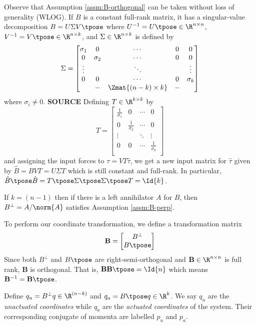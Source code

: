 Observe that Assumption \ref{assm:B-orthogonal} can be taken without loss of
generality (WLOG). If \(B\) is a constant full-rank matrix, 
it has a singular-value decomposition 
\(B = U \Sigma V\tpose\) where \(U^{-1} = U\tpose \in \R^{n \times n}\), 
\(V^{-1} = V\tpose \in \R^{n \times k}\), and \(\Sigma \in \R^{n \times k}\) is
defined by
\[
    \Sigma = \begin{bmatrix}
        \sigma_1 & 0 & \cdots & 0 & 0 \\
        0 & \sigma_2 & \cdots & 0 & 0 \\
        \vdots & & \ddots &  & \vdots \\
        0 & 0 & \cdots & 0 & \sigma_k \\
          & - & \Zmat{(n-k)\times k} & -  &\\
    \end{bmatrix}
\]
where \(\sigma_i \neq 0\).
\textbf{SOURCE}
Defining \(T \in \R^{k \times k}\) by
\[
    T = \begin{bmatrix}
        \frac{1}{\sigma_1} & 0 & \cdots & 0 \\
        0 & \frac{1}{\sigma_2} & \cdots & 0 \\
    \vdots & & \ddots & \vdots \\
    0 & 0 & \cdots & \frac{1}{\sigma_k} \\
    \end{bmatrix}
\]
and assigning the input forces to \(\tau = V T \hat{\tau}\), we get a new input
matrix for \(\hat{\tau}\) given by \(\hat{B} = B V T = U \Sigma T\) 
which is still constant and full-rank. In particular, 
\(\hat{B}\tpose \hat{B} = T\tpose \Sigma\tpose \Sigma\tpose T = \Id{k}\).

If \(k = (n-1)\) then if there is a left annihilator \(A\) for
\(B\), then \(B^\perp = A/\norm{A}\) satisfies Assumption
\ref{assm:B-perp}.

To perform our coordinate transformation, we define a transformation matrix
\[
    \mathbf{B} = 
    \begin{bmatrix}
        B^\perp \\
        B\tpose \\
    \end{bmatrix}
\]
Since both \(B^\perp\) and \(B\tpose\) are right-semi-orthogonal and
\(\mathbf{B} \in \R^{n \times n}\) is full rank, \(\mathbf{B}\) is orthogonal. 
That is, \(\mathbf{B}\mathbf{B}\tpose = \Id{n}\) which means 
\(\mathbf{B}^{-1} = \mathbf{B}\tpose\).

\begin{defn}
    Define \(q_u = B^\perp q \in \R^{(n-k)}\) and 
    \(q_a = B\tpose q \in \R^k\). We say \(q_u\) are the \textit{unactuated
    coordinates} while \(q_a\) are the \textit{actuated coordinates} of the
    system. Their corresponding conjugate of momenta are labelled \(p_u\) and
    \(p_a\).
\end{defn}

